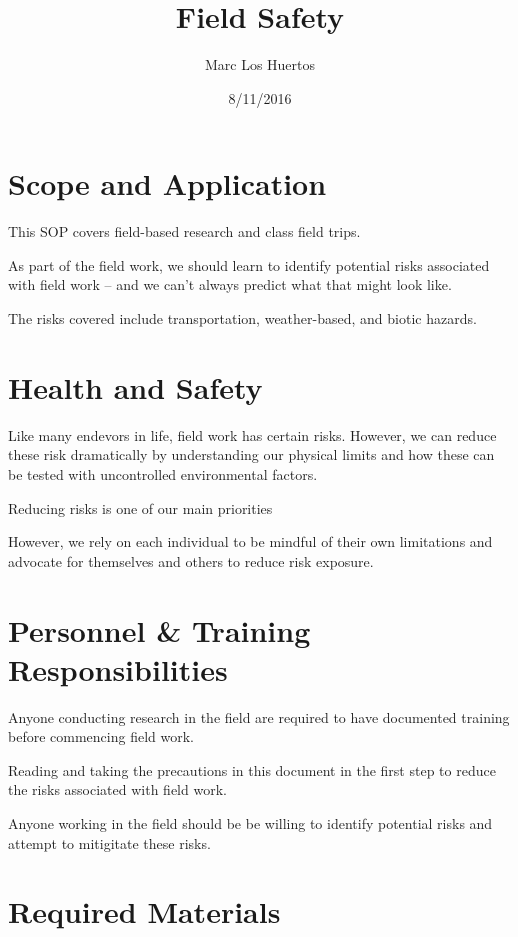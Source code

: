 \documentclass[12pt]{../SOP2}
\title{Field Safety}
\date{8/11/2016}
\author{Marc Los Huertos}
\begin{document}


\maketitle

\section{Scope and Application}

\NP This SOP covers field-based research and class field trips. 

\NP As part of the field work, we should learn to identify potential risks associated with field work -- and we can't always predict what that might look like.

\NP The risks covered include transportation, weather-based, and biotic hazards.

\section{Health and Safety}

\NP Like many endevors in life, field work has certain risks. However, we can reduce these risk dramatically by understanding our physical limits and how these can be tested with uncontrolled environmental factors.

\NP Reducing risks is one of our main priorities

\NP However, we rely on each individual to be mindful of their own limitations and advocate for themselves and others to reduce risk exposure.


\section{Personnel \& Training Responsibilities}

\NP Anyone conducting research in the field are required to have documented training before commencing field work. 

\NP Reading and taking the precautions in this document in the first step to reduce the risks associated with field work. 

\NP Anyone working in the field should be be willing to identify potential risks and attempt to mitigitate these risks. 

\section{Required Materials}
\end{document}
